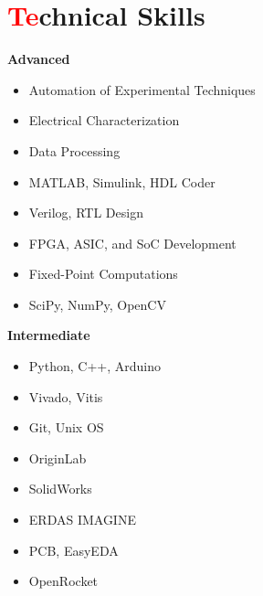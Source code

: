 \documentclass[a4paper,11pt]{article}
\begin{document}
\section{{\textcolor{red}{Te}chnical Skills}}
\begin{center}
    \begin{minipage}[t]{0.45\textwidth}
        \textbf{Advanced}
        \vspace{-7pt}
        \begin{itemize}
            \setlength{\itemindent}{0em}
            \setlength{\itemsep}{-3pt}
            \item Automation of Experimental Techniques
            \item Electrical Characterization
            \item Data Processing
            \item MATLAB, Simulink, HDL Coder
            \item Verilog, RTL Design
            \item FPGA, ASIC, and SoC Development
            \item Fixed-Point Computations
            \item SciPy, NumPy, OpenCV
        \end{itemize}
    \end{minipage}%
    \hfill
    \begin{minipage}[t]{0.45\textwidth}
        \textbf{Intermediate}
        \vspace{-7pt}
        \begin{itemize}
            \setlength{\itemindent}{0em}
            \setlength{\itemsep}{-3pt}
            \item Python, C++, Arduino
            \item Vivado, Vitis
            \item Git, Unix OS
            \item OriginLab
            \item SolidWorks
            \item ERDAS IMAGINE
            \item PCB, EasyEDA
            \item OpenRocket
        \end{itemize}
    \end{minipage}
\end{center}
\vspace{-15pt}

\end{document}
